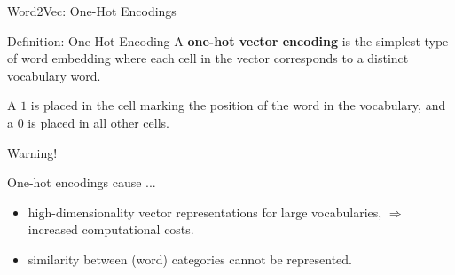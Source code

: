 \begin{frame}{Word2Vec: One-Hot Encodings}

    \begin{definitionBlock}{Definition: One-Hot Encoding}
    A \textbf{\alert{one-hot vector encoding}} is the simplest type of word embedding where each cell in the vector corresponds to a distinct vocabulary word. 
    
    
    A $1$ is placed in the cell marking the position of the word in the vocabulary, and a $0$ is placed in all other cells.
    \end{definitionBlock}
    
    \begin{alertBlock}{Warning!}
    
    One-hot encodings cause ...
    
    \begin{itemize}
        \item high-dimensionality vector representations for large vocabularies, $\Rightarrow$ increased computational costs.
        
        \item similarity between (word) categories cannot be represented.
    \end{itemize} 
    
    \end{alertBlock}
    
\end{frame}



